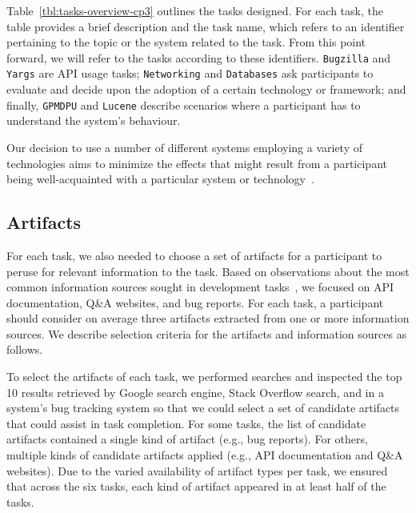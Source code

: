 Table~\ref{tbl:tasks-overview-cp3} outlines the tasks designed.
For each task, the table provides a brief description and the task name, which refers to an identifier pertaining to the topic or the system related to the task.
From this point forward, we will refer to the tasks according to these identifiers.
\texttt{Bugzilla} and \texttt{Yargs} are API usage tasks; \texttt{Networking} and \texttt{Databases} ask participants to evaluate and decide upon the adoption of a certain technology or framework; and finally, \texttt{GPMDPU} and \texttt{Lucene} describe scenarios where a participant 
has to understand the system's behaviour. 


Our decision to use a number of different systems employing
a variety of technologies aims to minimize the effects that might result from a participant being
well-acquainted with a particular system or technology~\cite{Wildemuth2012, DeGraaf2014}. 







\subsection{Artifacts}
\label{cp3:method-artifacts}



For each task, we also needed to choose a set of artifacts for a
participant to peruse for relevant information to the task.  Based on
observations about the most common information sources sought in
development tasks~\cite{Li2013, Ponzanelli2017},
we focused on API documentation, Q\&A websites, and
bug reports.
For each task, a participant should consider on average three artifacts extracted
from one or more information sources.
We describe selection criteria for the artifacts and information sources as follows.



To select the artifacts of each task, we performed
searches and inspected the top 10 results retrieved by Google search engine, Stack Overflow search, and in a
system's bug tracking system so that we could select a set of candidate artifacts that could
assist in task completion.
For some tasks, the list of candidate
artifacts contained a single kind of artifact (e.g., bug
reports). For others, multiple kinds of candidate artifacts applied
(e.g., API documentation and Q\&A websites). 
Due to the varied availability of artifact types per task, 
we ensured that across
the six tasks, each kind of artifact appeared in at least half of the
tasks.



